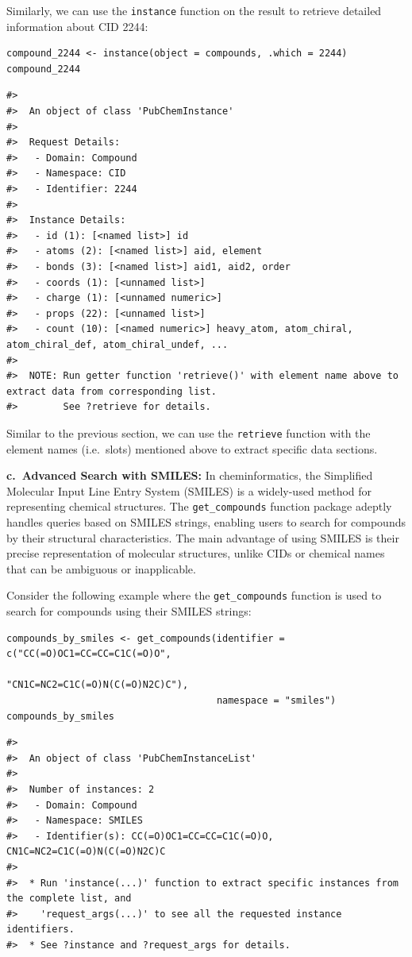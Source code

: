 Similarly, we can use the \texttt{instance} function on the result to retrieve detailed information about CID 2244:

\begin{verbatim}
compound_2244 <- instance(object = compounds, .which = 2244)
compound_2244
\end{verbatim}

\begin{verbatim}
#> 
#>  An object of class 'PubChemInstance'
#> 
#>  Request Details:  
#>   - Domain: Compound
#>   - Namespace: CID
#>   - Identifier: 2244
#> 
#>  Instance Details:  
#>   - id (1): [<named list>] id
#>   - atoms (2): [<named list>] aid, element
#>   - bonds (3): [<named list>] aid1, aid2, order
#>   - coords (1): [<unnamed list>] 
#>   - charge (1): [<unnamed numeric>] 
#>   - props (22): [<unnamed list>] 
#>   - count (10): [<named numeric>] heavy_atom, atom_chiral, atom_chiral_def, atom_chiral_undef, ...
#> 
#>  NOTE: Run getter function 'retrieve()' with element name above to extract data from corresponding list. 
#>        See ?retrieve for details.
\end{verbatim}

Similar to the previous section, we can use the \texttt{retrieve} function with the element names (i.e.~slots) mentioned above to extract specific data sections.

\textbf{c.~Advanced Search with SMILES:} In cheminformatics, the Simplified Molecular Input Line Entry System (SMILES) is a widely-used method for representing chemical structures. The \texttt{get\_compounds} function package adeptly handles queries based on SMILES strings, enabling users to search for compounds by their structural characteristics. The main advantage of using SMILES is their precise representation of molecular structures, unlike CIDs or chemical names that can be ambiguous or inapplicable.

Consider the following example where the \texttt{get\_compounds} function is used to search for compounds using their SMILES strings:

\begin{verbatim}
compounds_by_smiles <- get_compounds(identifier = c("CC(=O)OC1=CC=CC=C1C(=O)O", 
                                                    "CN1C=NC2=C1C(=O)N(C(=O)N2C)C"), 
                                     namespace = "smiles")  
compounds_by_smiles
\end{verbatim}

\begin{verbatim}
#> 
#>  An object of class 'PubChemInstanceList'
#> 
#>  Number of instances: 2
#>   - Domain: Compound
#>   - Namespace: SMILES
#>   - Identifier(s): CC(=O)OC1=CC=CC=C1C(=O)O, CN1C=NC2=C1C(=O)N(C(=O)N2C)C
#> 
#>  * Run 'instance(...)' function to extract specific instances from the complete list, and
#>    'request_args(...)' to see all the requested instance identifiers.
#>  * See ?instance and ?request_args for details.
\end{verbatim}

